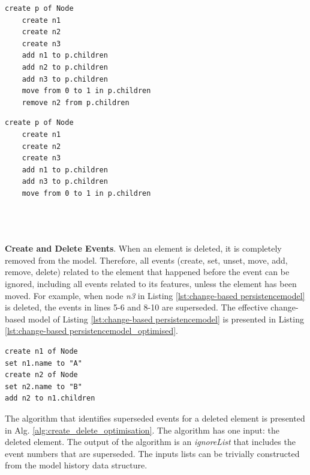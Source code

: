 \documentclass[12pt, a4paper]{report} \usepackage[titletoc]{appendix}
\begin{document}
\noindent
\begin{minipage}[t]{0.48\linewidth}
	\begin{lstlisting}[style=eol,caption={The change-based persistence representation of reference \emph{children}'s move event.},label=lst:move_attribute_example]
	create p of Node
	create n1
	create n2
	create n3
	add n1 to p.children
	add n2 to p.children
	add n3 to p.children
	move from 0 to 1 in p.children
	remove n2 from p.children
	\end{lstlisting}
\end{minipage}
\hfill
\begin{minipage}[t]{0.48\linewidth}
	\begin{lstlisting}[style=eol,caption={The effective change-based persistence representation of reference \emph{children}'s move event.},label=lst:move_attribute_example_error]
	create p of Node
	create n1
	create n2
	create n3
	add n1 to p.children
	add n3 to p.children
	move from 0 to 1 in p.children
	\end{lstlisting}
\end{minipage}
\\\\\\
\textbf{Create and Delete Events}\label{subsec:create_and_delete_operations}. When an element is deleted, it is completely removed from the model. Therefore, all events (create, set, unset, move, add, remove, delete) related to the element that happened before the event can be ignored, including all events related to its features, unless the element has been moved. For example, when node \emph{n3} in Listing \ref{lst:change-based persistencemodel}  is deleted, the events in lines 5-6 and 8-10 are superseded. The effective change-based model of Listing \ref{lst:change-based persistencemodel} is presented in Listing \ref{lst:change-based persistencemodel_optimised}.

\begin{lstlisting}[style=eol,caption={Change-based representation of the model of Fig. \ref{fig:initial_model} after removal of node \emph{n5}.},label=lst:change-based persistencemodel_optimised]
create n1 of Node
set n1.name to "A"
create n2 of Node
set n2.name to "B"
add n2 to n1.children
\end{lstlisting}

The algorithm that identifies superseded events for a deleted element is presented in Alg. \ref{alg:create_delete_optimisation}. The algorithm has one input: the deleted element. The output of the algorithm is an \emph{ignoreList} that includes the event numbers that are superseded. The inputs lists can be trivially constructed from the model history data structure.
\end{document}
